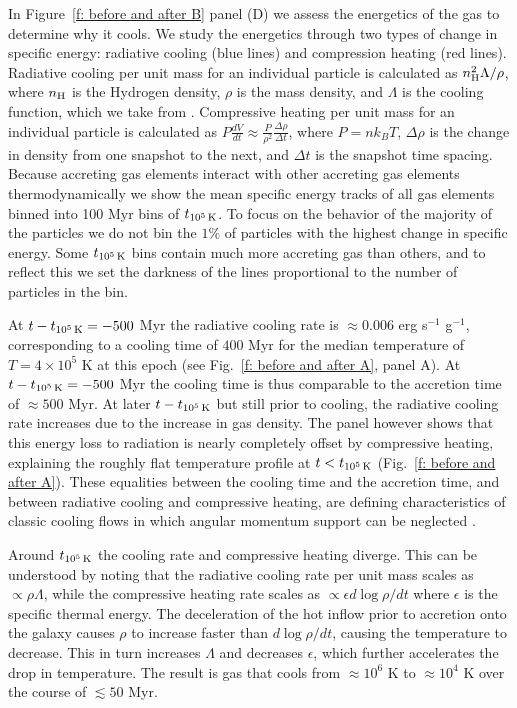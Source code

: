 \documentclass[fleqn,usenatbib]{mnras}
\newcommand{\tcon}{t_{10^5\,{\rm K}}}
\newcommand{\nH}{n_{\rm H}}
\begin{document}
In Figure~\ref{f: before and after B} panel (D) we assess the energetics of the gas to determine why it cools.
We study the energetics through two types of change in specific energy: radiative cooling (blue lines) and compression heating (red lines).
Radiative cooling per unit mass for an individual particle is calculated as $\nH^2 \Lambda / \rho$, where $\nH$ is the Hydrogen density, $\rho$ is the mass density, and $\Lambda$ is the cooling function, which we take from \cite{Wiersma2009a}.
Compressive heating per unit mass for an individual particle is calculated as $P \frac{dV}{dt} \approx \frac{ P }{ \rho^2 } \frac{ \Delta \rho }{ \Delta t }$, where $P = n k_B T$, $\Delta \rho$ is the change in density from one snapshot to the next, and $\Delta t$ is the snapshot time spacing.
Because accreting gas elements interact with other accreting gas elements thermodynamically we show the mean specific energy tracks of all gas elements binned into 100 Myr bins of $\tcon$.
To focus on the behavior of the majority of the particles we do not bin the $1\%$ of particles with the highest change in specific energy.
Some $\tcon$ bins contain much more accreting gas than others, and to reflect this we set the darkness of the lines proportional to the number of particles in the bin.

At $t-\tcon=-500$ Myr the radiative cooling rate is $\approx0.006$ erg s$^{-1}$ g$^{-1}$, corresponding to a cooling time of $400$ Myr for the median temperature of $T=4\times 10^5$ K at this epoch (see Fig.~\ref{f: before and after A}, panel A).
At $t-\tcon =-500$ Myr the cooling time is thus comparable to the accretion time of $\approx500$ Myr.
At later $t-\tcon$ but still prior to cooling, the radiative cooling rate increases due to the increase in gas density.
The panel however shows that this energy loss to radiation  is nearly completely offset by compressive heating, explaining the roughly flat temperature profile at $t<\tcon$ (Fig.~\ref{f: before and after A}). 
These equalities between the cooling time and the accretion time, and between radiative cooling and compressive heating, are defining   characteristics of classic cooling flows in which angular momentum support can be neglected \citep{Mathews1978, McNamara2007, Stern2019}. 

Around $\tcon$ the cooling rate and compressive heating diverge.
This can be understood by noting that the radiative cooling rate per unit mass scales as $\propto\rho\Lambda$, while the compressive heating rate scales as $\propto\epsilon d\log\rho/d t$ where $\epsilon$ is the specific thermal energy.
The deceleration of the hot inflow prior to accretion onto the galaxy causes $\rho$ to increase faster than $d\log\rho/d t$, causing the temperature to decrease.
This in turn increases $\Lambda$ and decreases $\epsilon$, which further accelerates the drop in temperature.
The result is gas that cools from $\approx10^6$ K to $\approx10^4$ K over the course of $\lesssim 50$ Myr.
\end{document}
